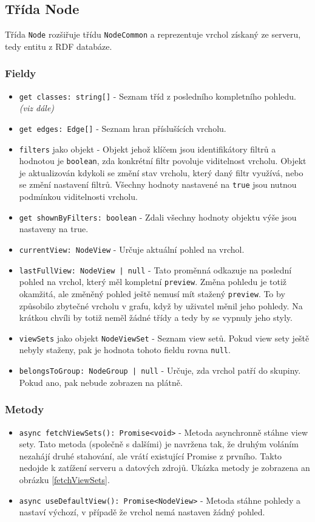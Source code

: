 \subsection{Třída Node}
Třída \texttt{Node} rozšiřuje třídu \texttt{NodeCommon} a reprezentuje vrchol získaný ze serveru, tedy entitu z RDF databáze.

\subsubsection*{Fieldy}
\begin{itemize}
  \item \texttt{get classes: string[]} - Seznam tříd z posledního kompletního pohledu. \textit{(viz dále)}
  \item \texttt{get edges: Edge[]} - Seznam hran příslušících vrcholu.
  \item \texttt{filters} jako objekt - Objekt jehož klíčem jsou identifikátory filtrů a hodnotou je \texttt{boolean}, zda konkrétní filtr povoluje viditelnost vrcholu. Objekt je aktualizován kdykoli se změní stav vrcholu, který daný filtr využívá, nebo se změní nastavení filtrů. Všechny hodnoty nastavené na \texttt{true} jsou nutnou podmínkou viditelnosti vrcholu.
  \item \texttt{get shownByFilters: boolean} - Zdali všechny hodnoty objektu výše jsou nastaveny na true.
  \item \texttt{currentView: NodeView} - Určuje aktuální pohled na vrchol.
  \item \texttt{lastFullView: NodeView | null} - Tato proměnná odkazuje na poslední pohled na vrchol, který měl kompletní \texttt{preview}. Změna pohledu je totiž okamžitá, ale změněný pohled ještě nemusí mít stažený \texttt{preview}. To by způsobilo zbytečné  vrcholu v grafu, když by uživatel měnil jeho pohledy. Na krátkou chvíli by totiž neměl žádné třídy a tedy by se vypnuly jeho styly.
  \item \texttt{viewSets} jako objekt \texttt{NodeViewSet} - Seznam view setů. Pokud view sety ještě nebyly staženy, pak je hodnota tohoto fieldu rovna \texttt{null}.
  \item \texttt{belongsToGroup: NodeGroup | null} - Určuje, zda vrchol patří do skupiny. Pokud ano, pak nebude zobrazen na plátně.
\end{itemize}


\subsubsection*{Metody}
\begin{itemize}
  \item \texttt{async fetchViewSets(): Promise<void>} - Metoda asynchronně stáhne view sety. Tato metoda (společně s dalšími) je navržena tak, že druhým voláním nezahájí druhé stahování, ale vrátí existující Promise z prvního. Takto nedojde k zatížení serveru a datových zdrojů. Ukázka metody je zobrazena an obrázku \ref{fetchViewSets}.
  \item \texttt{async useDefaultView(): Promise<NodeView>} - Metoda stáhne pohledy a nastaví výchozí, v případě že vrchol nemá nastaven žádný pohled.
\end{itemize}

